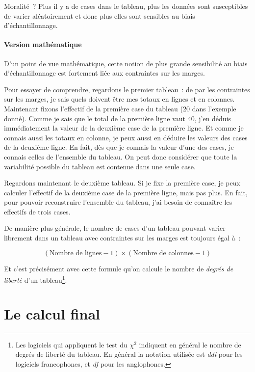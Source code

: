 \documentclass[a4paper,10pt,twoside,francais]{report}
\newcommand{\chid}{$\chi^2$\xspace}
\begin{document}
Moralité~? Plus il y a de cases dans le tableau, plus les données sont
susceptibles de varier aléatoirement et donc plus elles sont sensibles
au biais d'échantillonnage.

\paragraph{Version mathématique} D'un point de vue mathématique, cette
notion de \og plus grande sensibilité au biais d'échantillonnage \fg{} est
fortement liée aux contraintes sur les marges. 

Pour essayer de comprendre, regardons le premier tableau~: de par les
contraintes sur les marges, je sais quels doivent être mes totaux en
lignes et en colonnes. Maintenant fixons l'effectif de la première
case du tableau (20 dans l'exemple donné). Comme je sais que le total
de la première ligne vaut 40, j'en déduis immédiatement la valeur de
la deuxième case de la première ligne. Et comme je connais aussi les
totaux en colonne, je peux aussi en déduire les valeurs des cases de
la deuxième ligne. En fait, dès que je connais la valeur d'une des
cases, je connais celles de l'ensemble du tableau. On peut donc
considérer que toute la variabilité possible du tableau est contenue
dans une seule case.

Regardons maintenant le deuxième tableau. Si je fixe la première case,
je peux calculer l'effectif de la deuxième case de la première ligne,
mais pas plus. En fait, pour pouvoir reconstruire l'ensemble du
tableau, j'ai besoin de connaître les effectifs de trois cases.

De manière plus générale, le nombre de cases d'un tableau pouvant
varier \og librement \fg{} dans un tableau avec contraintes sur les marges
est toujours égal à~:

$$(\text{Nombre de lignes} - 1) \times (\text{Nombre de colonnes} -
1)$$

Et c'est précisément avec cette formule qu'on calcule le nombre de
\textit{degrés de liberté} d'un tableau\footnote{Les logiciels qui
  appliquent le test du \chid indiquent en général le nombre de degrés
  de liberté du tableau. En général la notation utilisée est
  \textit{ddl} pour les logiciels francophones, et \textit{df} pour
  les anglophones.}.


\section{Le calcul final}
\label{ssec-calcp}
\end{document}
